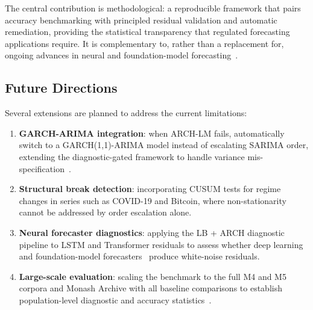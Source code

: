 \documentclass[sn-mathphys-num,pdflatex]{sn-jnl}
\begin{document}
The central contribution is methodological: a reproducible framework
that pairs accuracy benchmarking with principled residual validation
and automatic remediation, providing the statistical transparency
that regulated forecasting applications require. It is complementary
to, rather than a replacement for, ongoing advances in neural and
foundation-model forecasting~\cite{oreshkin2019nbeats, challu2022nhits, salinas2020deepar, lim2021tft, zhou2021informer, wu2021autoformer, nie2022patchtst, zhou2023itransformer, ansari2024chronos, das2024timesfm, jin2023timellm, kottapalli2025survey, achour2025conformal, fu2026reverso, karaouli2025foundational, rahimikia2025finance, kim2025deeplearningsurvey}.

\subsection{Future Directions}
Several extensions are planned to address the current limitations:
\begin{enumerate}
\item \textbf{GARCH-ARIMA integration}: when ARCH-LM fails,
automatically switch to a GARCH(1,1)-ARIMA model instead of
escalating SARIMA order, extending the diagnostic-gated
framework to handle variance mis-specification~\cite{engle1982, bollerslev1986garch}.
\item \textbf{Structural break detection}: incorporating CUSUM
tests for regime changes in series such as COVID-19 and
Bitcoin, where non-stationarity cannot be addressed by order
escalation alone.
\item \textbf{Neural forecaster diagnostics}: applying the LB +
ARCH diagnostic pipeline to LSTM and Transformer residuals
to assess whether deep learning and foundation-model
forecasters~\cite{oreshkin2019nbeats, challu2022nhits, salinas2020deepar, lim2021tft, zhou2021informer, wu2021autoformer, nie2022patchtst, zhou2023itransformer, ansari2024chronos, das2024timesfm, jin2023timellm, fu2026reverso, kottapalli2025survey, achour2025conformal, karaouli2025foundational, rahimikia2025finance, kim2025deeplearningsurvey}
produce white-noise residuals.
\item \textbf{Large-scale evaluation}: scaling the benchmark to
the full M4 and M5 corpora and Monash Archive with all baseline
comparisons to establish population-level diagnostic and accuracy statistics~\cite{makridakis2020m4, makridakis2022m5, godahewa2021monash}.
\end{enumerate}
\end{document}
